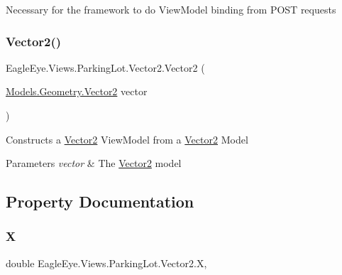 Necessary for the framework to do View\+Model binding from P\+O\+ST requests 

\mbox{\label{class_eagle_eye_1_1_views_1_1_parking_lot_1_1_vector2_a09d06dd70916e05a76b0da35718ba02c}} 
\subsubsection{\texorpdfstring{Vector2()}{Vector2()}\hspace{0.1cm}{\footnotesize\ttfamily [2/2]}}
{\footnotesize\ttfamily Eagle\+Eye.\+Views.\+Parking\+Lot.\+Vector2.\+Vector2 (\begin{DoxyParamCaption}\item[{\mbox{\hyperlink{struct_eagle_eye_1_1_models_1_1_geometry_1_1_vector2}{Models.\+Geometry.\+Vector2}}}]{vector }\end{DoxyParamCaption})}



Constructs a \mbox{\hyperlink{class_eagle_eye_1_1_views_1_1_parking_lot_1_1_vector2}{Vector2}} View\+Model from a \mbox{\hyperlink{class_eagle_eye_1_1_views_1_1_parking_lot_1_1_vector2}{Vector2}} Model 


\begin{DoxyParams}{Parameters}
{\em vector} & The \mbox{\hyperlink{class_eagle_eye_1_1_views_1_1_parking_lot_1_1_vector2}{Vector2}} model\\
\hline
\end{DoxyParams}


\subsection{Property Documentation}
\mbox{\label{class_eagle_eye_1_1_views_1_1_parking_lot_1_1_vector2_a55e65b3a51370ae1c14539d818309ead}} 
\subsubsection{\texorpdfstring{X}{X}}
{\footnotesize\ttfamily double Eagle\+Eye.\+Views.\+Parking\+Lot.\+Vector2.\+X\hspace{0.3cm}{\ttfamily [get]}, {\ttfamily [set]}}



